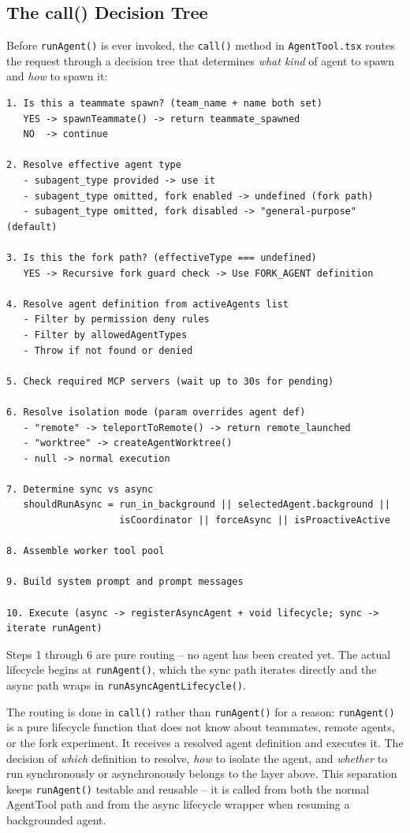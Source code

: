 \documentclass[
  english,
  11pt,
  letterpaper,
]{book}
\begin{document}
\subsection{The call() Decision Tree}\label{the-call-decision-tree}

Before \texttt{runAgent()} is ever invoked, the \texttt{call()} method
in \texttt{AgentTool.tsx} routes the request through a decision tree
that determines \emph{what kind} of agent to spawn and \emph{how} to
spawn it:

\begin{verbatim}
1. Is this a teammate spawn? (team_name + name both set)
   YES -> spawnTeammate() -> return teammate_spawned
   NO  -> continue

2. Resolve effective agent type
   - subagent_type provided -> use it
   - subagent_type omitted, fork enabled -> undefined (fork path)
   - subagent_type omitted, fork disabled -> "general-purpose" (default)

3. Is this the fork path? (effectiveType === undefined)
   YES -> Recursive fork guard check -> Use FORK_AGENT definition

4. Resolve agent definition from activeAgents list
   - Filter by permission deny rules
   - Filter by allowedAgentTypes
   - Throw if not found or denied

5. Check required MCP servers (wait up to 30s for pending)

6. Resolve isolation mode (param overrides agent def)
   - "remote" -> teleportToRemote() -> return remote_launched
   - "worktree" -> createAgentWorktree()
   - null -> normal execution

7. Determine sync vs async
   shouldRunAsync = run_in_background || selectedAgent.background ||
                    isCoordinator || forceAsync || isProactiveActive

8. Assemble worker tool pool

9. Build system prompt and prompt messages

10. Execute (async -> registerAsyncAgent + void lifecycle; sync -> iterate runAgent)
\end{verbatim}

Steps 1 through 6 are pure routing -- no agent has been created yet. The
actual lifecycle begins at \texttt{runAgent()}, which the sync path
iterates directly and the async path wraps in
\texttt{runAsyncAgentLifecycle()}.

The routing is done in \texttt{call()} rather than \texttt{runAgent()}
for a reason: \texttt{runAgent()} is a pure lifecycle function that does
not know about teammates, remote agents, or the fork experiment. It
receives a resolved agent definition and executes it. The decision of
\emph{which} definition to resolve, \emph{how} to isolate the agent, and
\emph{whether} to run synchronously or asynchronously belongs to the
layer above. This separation keeps \texttt{runAgent()} testable and
reusable -- it is called from both the normal AgentTool path and from
the async lifecycle wrapper when resuming a backgrounded agent.
\end{document}
